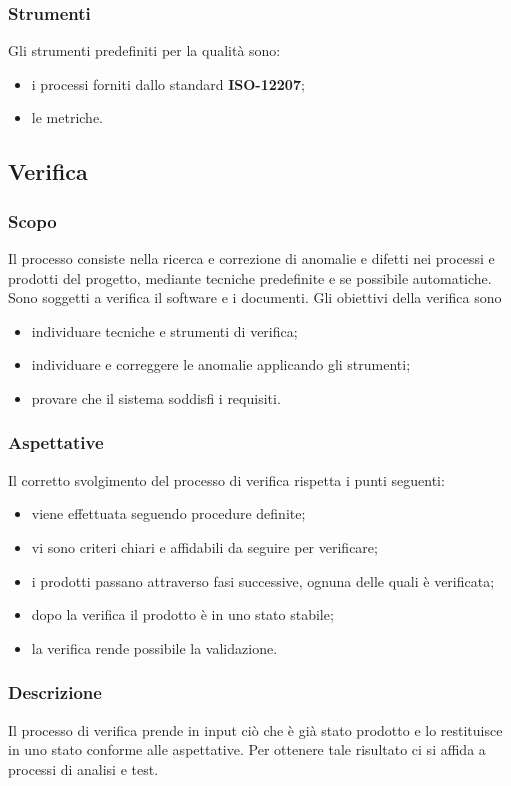 	\subsubsection{Strumenti}
	Gli strumenti predefiniti per la qualità sono: 
	\begin{itemize}
		\item i processi forniti dallo standard \textbf{ISO-12207};
		\item le metriche.
	\end{itemize}

\subsection{Verifica}
	\subsubsection{Scopo}
	Il processo consiste nella ricerca e correzione di anomalie e difetti nei processi e prodotti del	progetto, mediante tecniche predefinite e se possibile automatiche.
	Sono soggetti a verifica il software e i documenti.
	Gli obiettivi della verifica sono
	\begin{itemize}
		\item individuare tecniche e strumenti di verifica;
		\item individuare e correggere le anomalie applicando gli strumenti;
		\item provare che il sistema soddisfi i requisiti.
	\end{itemize} 
	\subsubsection{Aspettative}
	Il corretto svolgimento del processo di verifica rispetta i punti seguenti:	
	\begin{itemize}
		\item viene effettuata seguendo procedure definite;
		\item vi sono criteri chiari e affidabili da seguire per verificare;
		\item i prodotti passano attraverso fasi successive, ognuna delle quali è verificata;
		\item dopo la verifica il prodotto è in uno stato stabile;
		\item la verifica rende possibile la validazione.
	\end{itemize}
	\subsubsection{Descrizione}
	Il processo di verifica prende in input ciò che è già stato prodotto e lo restituisce in uno stato conforme alle aspettative. Per ottenere tale risultato ci si affida a processi di analisi e test.
